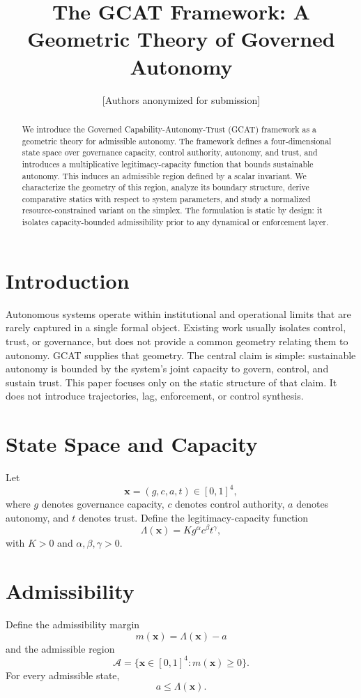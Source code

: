 \documentclass[letterpaper,10pt,conference]{ieeeconf}
\title{\bf The GCAT Framework: A Geometric Theory of Governed Autonomy}
\author{[Authors anonymized for submission]}
\newcommand{\x}{\mathbf{x}}
\newcommand{\A}{\mathcal{A}}
\newcommand{\Lam}{\Lambda}
\begin{document}
\maketitle
\thispagestyle{empty}
\pagestyle{empty}
\begin{abstract}
We introduce the Governed Capability-Autonomy-Trust (GCAT) framework as a geometric theory for admissible autonomy. The framework defines a four-dimensional state space over governance capacity, control authority, autonomy, and trust, and introduces a multiplicative legitimacy-capacity function that bounds sustainable autonomy. This induces an admissible region defined by a scalar invariant. We characterize the geometry of this region, analyze its boundary structure, derive comparative statics with respect to system parameters, and study a normalized resource-constrained variant on the simplex. The formulation is static by design: it isolates capacity-bounded admissibility prior to any dynamical or enforcement layer.
\end{abstract}
\section{Introduction}
Autonomous systems operate within institutional and operational limits that are rarely captured in a single formal object. Existing work usually isolates control, trust, or governance, but does not provide a common geometry relating them to autonomy.
GCAT supplies that geometry. The central claim is simple: sustainable autonomy is bounded by the system's joint capacity to govern, control, and sustain trust. This paper focuses only on the static structure of that claim. It does not introduce trajectories, lag, enforcement, or control synthesis.
\section{State Space and Capacity}
Let
\[
\x=(g,c,a,t)\in[0,1]^4,
\]
where $g$ denotes governance capacity, $c$ denotes control authority, $a$ denotes autonomy, and $t$ denotes trust.
Define the legitimacy-capacity function
\[
\Lam(\x)=K g^\alpha c^\beta t^\gamma,
\]
with $K>0$ and $\alpha,\beta,\gamma>0$.
\section{Admissibility}
Define the admissibility margin
\[
m(\x)=\Lam(\x)-a
\]
and the admissible region
\[
\A=\{\x\in[0,1]^4:m(\x)\ge 0\}.
\]
For every admissible state,
\[
a\le \Lam(\x).
\]
\end{document}
